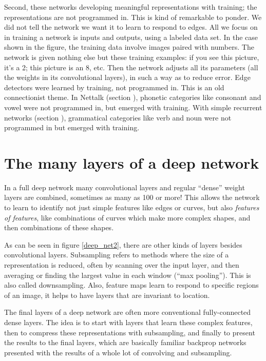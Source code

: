 Second, these networks developing meaningful representations with training; the representations are not programmed in. This is kind of remarkable to ponder. We did not tell the network we want it to learn to respond to edges. All we focus on in training a network is inputs and outputs, using a labeled data set.  In the case shown in the figure, the training data involve images paired with numbers. The network is given nothing else but these training examples: if you see this picture, it's a 2; this picture is an 8, etc. Then the network adjusts all its parameters (all the weights in its convolutional layers), in such a way as to reduce error.  Edge detectors were learned by training, not programmed in. This is an old connectionist theme. In Nettalk (section ), phonetic categories like consonant and vowel were not programmed in, but emerged with training. With simple recurrent networks  (section ), grammatical categories like verb and noun were not programmed in but  emerged with training.

\section{The many layers of a deep network}

In a full deep network many convolutional layers and regular ``dense'' weight layers are combined, sometimes as many as 100 or more! This allows the network to learn to identify not just simple features like edges or curves, but also \emph{features of features}, like combinations of curves which make more complex shapes, and then combinations of these shapes. 

As can be seen in figure \ref{deep_net2}, there are other kinds of layers besides convolutional layers. Subsampling refers to methods where the size of a representation is reduced, often by scanning over the input layer, and then averaging or finding the largest value in each window (``max pooling'').  This is also called downsampling.  Also, feature maps learn to respond to specific regions of an image, it helps to have layers that are invariant to location. 

The final layers of a deep network are often more conventional fully-connected dense layers. The idea is to start with layers that learn these complex features, then to compress these representations with subsampling, and finally to present the results to the final layers, which are basically familiar backprop networks presented with the results of a whole lot of convolving and subsampling.

